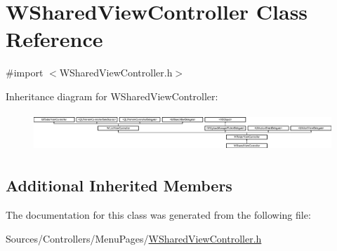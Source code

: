 \hypertarget{interface_w_shared_view_controller}{\section{W\-Shared\-View\-Controller Class Reference}
\label{interface_w_shared_view_controller}
}


{\ttfamily \#import $<$W\-Shared\-View\-Controller.\-h$>$}

Inheritance diagram for W\-Shared\-View\-Controller\-:\begin{figure}[H]
\begin{center}
\leavevmode
\includegraphics[height=1.447964cm]{interface_w_shared_view_controller}
\end{center}
\end{figure}
\subsection*{Additional Inherited Members}


The documentation for this class was generated from the following file\-:\begin{DoxyCompactItemize}
\item 
Sources/\-Controllers/\-Menu\-Pages/\hyperlink{_w_shared_view_controller_8h}{W\-Shared\-View\-Controller.\-h}\end{DoxyCompactItemize}
